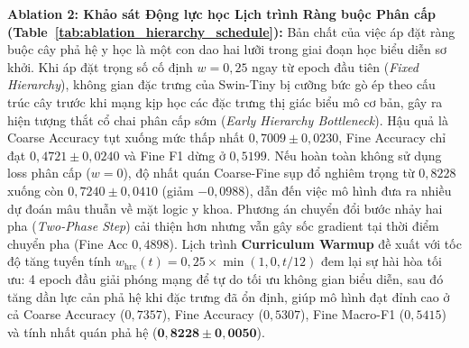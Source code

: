 \documentclass[runningheads]{llncs}
\begin{document}
\noindent \textbf{Ablation 2: Khảo sát Động lực học Lịch trình Ràng buộc Phân cấp (Table~\ref{tab:ablation_hierarchy_schedule}):} 
Bản chất của việc áp đặt ràng buộc cây phả hệ y học là một con dao hai lưỡi trong giai đoạn học biểu diễn sơ khởi. Khi áp đặt trọng số cố định $w=0{,}25$ ngay từ epoch đầu tiên (\textit{Fixed Hierarchy}), không gian đặc trưng của Swin-Tiny bị cưỡng bức gò ép theo cấu trúc cây trước khi mạng kịp học các đặc trưng thị giác biểu mô cơ bản, gây ra hiện tượng thắt cổ chai phân cấp sớm (\textit{Early Hierarchy Bottleneck}). Hậu quả là Coarse Accuracy tụt xuống mức thấp nhất $0{,}7009 \pm 0{,}0230$, Fine Accuracy chỉ đạt $0{,}4721 \pm 0{,}0240$ và Fine F1 dừng ở $0{,}5199$. Nếu hoàn toàn không sử dụng loss phân cấp ($w=0$), độ nhất quán Coarse-Fine sụp đổ nghiêm trọng từ $0{,}8228$ xuống còn $0{,}7240 \pm 0{,}0410$ (giảm $-0{,}0988$), dẫn đến việc mô hình đưa ra nhiều dự đoán mâu thuẫn về mặt logic y khoa. Phương án chuyển đổi bước nhảy hai pha (\textit{Two-Phase Step}) cải thiện hơn nhưng vẫn gây sốc gradient tại thời điểm chuyển pha (Fine Acc $0{,}4898$). Lịch trình \textbf{Curriculum Warmup} đề xuất với tốc độ tăng tuyến tính $w_{\text{hrc}}(t) = 0{,}25 \times \min(1{,}0, t/12)$ đem lại sự hài hòa tối ưu: 4 epoch đầu giải phóng mạng để tự do tối ưu không gian biểu diễn, sau đó tăng dần lực cản phả hệ khi đặc trưng đã ổn định, giúp mô hình đạt đỉnh cao ở cả Coarse Accuracy ($0{,}7357$), Fine Accuracy ($0{,}5307$), Fine Macro-F1 ($0{,}5415$) và tính nhất quán phả hệ ($\mathbf{0{,}8228 \pm 0{,}0050}$).
\end{document}
